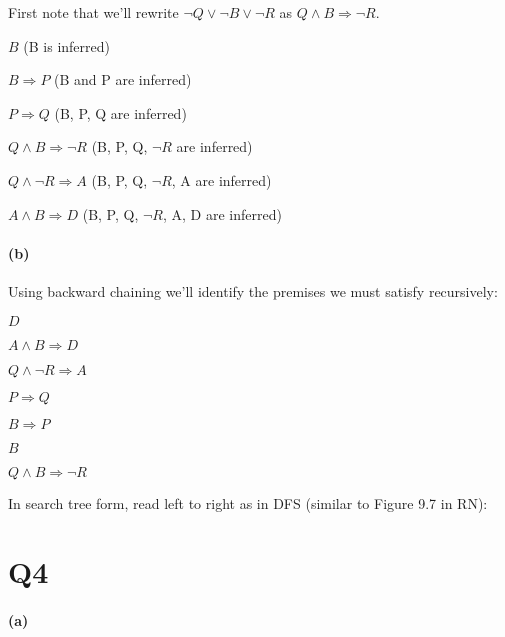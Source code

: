 \documentclass[11pt,a4paper]{article}
\begin{document}
First note that we'll rewrite $\neg Q \vee \neg B \vee \neg R$ as $Q \wedge B \Rightarrow \neg R$. 

$B$  \qquad (B is inferred)
 
$B \Rightarrow P$   \qquad (B and P are inferred)

$P \Rightarrow Q$   \qquad(B, P, Q are inferred) 

$Q \wedge B \Rightarrow \neg R$  \qquad (B, P, Q, $\neg R$ are inferred)

$Q \wedge \neg R \Rightarrow A$  \qquad (B, P, Q, $\neg R$, A are inferred)

$A \wedge B \Rightarrow D$     \qquad (B, P, Q, $\neg R$, A, D are inferred)

\paragraph*{(b)}

Using backward chaining we'll identify the premises we must satisfy recursively:

$D$

$A \wedge B \Rightarrow D$

$Q \wedge \neg R \Rightarrow A$

$P \Rightarrow Q$

$B \Rightarrow P$

$B$

$Q \wedge B \Rightarrow \neg R$


In search tree form, read left to right as in DFS (similar to Figure 9.7 in RN):
\begin{center}
\end{center}

\section*{Q4}
\paragraph*{(a)}
\end{document}
